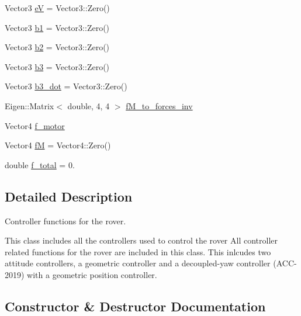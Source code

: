 \begin{DoxyCompactItemize}
\item 
Vector3 \hyperlink{classfdcl_1_1control_aa0c21496bf7ffffa421e6431c1581bad}{eV} = Vector3\+::\+Zero()
\item 
Vector3 \hyperlink{classfdcl_1_1control_a5ba3e080f42c5ffb282b948b44f3b877}{b1} = Vector3\+::\+Zero()
\item 
Vector3 \hyperlink{classfdcl_1_1control_a6d578fe584100b8f07e9dc6ff7ca01e0}{b2} = Vector3\+::\+Zero()
\item 
Vector3 \hyperlink{classfdcl_1_1control_a7f1776cc82d2375ff788a639baa4064b}{b3} = Vector3\+::\+Zero()
\item 
Vector3 \hyperlink{classfdcl_1_1control_a6c9ba83faa7eae7dde44e9619e08d726}{b3\+\_\+dot} = Vector3\+::\+Zero()
\item 
Eigen\+::\+Matrix$<$ double, 4, 4 $>$ \hyperlink{classfdcl_1_1control_ae111bb213798d710e4ce5b0392a8ab18}{f\+M\+\_\+to\+\_\+forces\+\_\+inv}
\item 
Vector4 \hyperlink{classfdcl_1_1control_aaad0595254a9a993566163d813830491}{f\+\_\+motor}
\item 
Vector4 \hyperlink{classfdcl_1_1control_ac27cf9d04a9f9157eb275eaac60c066d}{fM} = Vector4\+::\+Zero()
\item 
double \hyperlink{classfdcl_1_1control_a14297e7595c3f41cd953a34c767c24f0}{f\+\_\+total} = 0.
\end{DoxyCompactItemize}


\subsection{Detailed Description}
Controller functions for the rover. 

This class includes all the controllers used to control the rover All controller related functions for the rover are included in this class. This inlcudes two attitude controllers, a geometric controller and a decoupled-\/yaw controller (A\+C\+C-\/2019) with a geometric position controller. 

\subsection{Constructor \& Destructor Documentation}
